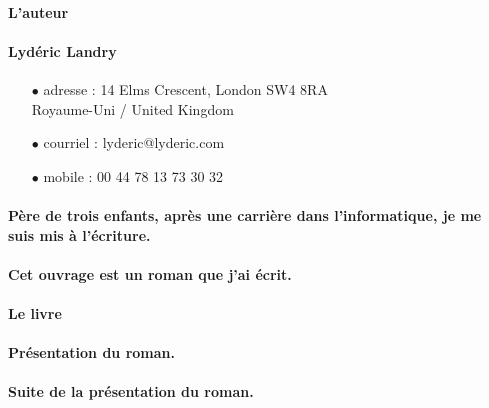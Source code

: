 \thispagestyle{empty}
\paragraph{\Huge L'auteur}
\vspace{1cm}
\paragraph{\textbf{Lydéric Landry}}
\begin{itemize}
\item[$\bullet$ adresse] : 14 Elms Crescent, London SW4 8RA \\
Royaume-Uni / United Kingdom
\item[$\bullet$ courriel] : lyderic@lyderic.com
\item[$\bullet$ mobile] : 00 44 78 13 73 30 32
\end{itemize}
\paragraph{Père de trois enfants, après une carrière dans l'informatique, je me suis mis à l'écriture.}
\paragraph{Cet ouvrage est un roman que j'ai écrit.}
\paragraph{\Huge Le livre}
\vspace{1cm}
\paragraph{Présentation du roman.}
\paragraph{Suite de la présentation du roman.}
\clearpage
